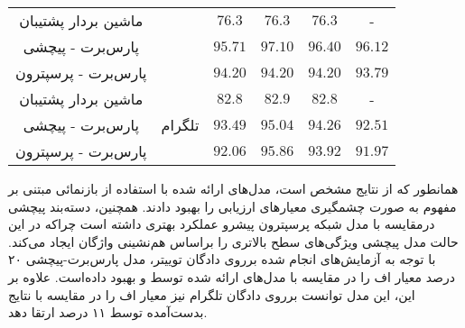 \begin{itemize}
\begin{table}
\begin{center}
\begin{tabular}{|c|c|c|c|c|c|}
			\cline{1-1}
			\cline{3-6}
			ماشین بردار پشتیبان \citep{jahanbakhsh2020model} &
			 & $76.3$ & $76.3$ & $76.3$ & - \\
			\cline{1-1}
			\cline{3-6}
			پارس‌برت - پیچشی & & $95.71$ & $97.10$ & $96.40$ & $96.12$ \\
			\cline{1-1}
			\cline{3-6}
			پارس‌برت - پرسپترون & & $94.20$ & $94.20$ & $94.20$ & $93.79$ \\
			\hline
			ماشین بردار پشتیبان \citep{jahanbakhsh2020model} &
			\multirow{3}{*}{تلگرام}& $82.8$ & $82.9$ & $82.8$ & - \\
			\cline{1-1}
			\cline{3-6}
			پارس‌برت - پیچشی & & $93.49$ & $95.04$ & $94.26$ & $92.51$ \\
			\cline{1-1}
			\cline{3-6}
			پارس‌برت - پرسپترون & & $92.06$ & $95.86$ & $93.92$ & $91.97$ \\
			\hline
		\end{tabular}
	\end{center}
\end{table}
\end{itemize}
	
	همانطور که از نتایج مشخص است، مدل‌های ارائه شده با استفاده از بازنمائی‌ مبتنی بر مفهوم به صورت چشمگیری معیار‌های ارزیابی را بهبود دادند. همچنین، دسته‌بند پیچشی درمقایسه با مدل شبکه پرسپترون پیشرو عملکرد بهتری داشته است چراکه در این حالت مدل پیچشی ویژگی‌های سطح بالاتری را براساس هم‌نشینی واژگان ایجاد می‌کند. با توجه به آزمایش‌های انجام شده برروی دادگان توییتر، مدل پارس‌برت-پیچشی ۲۰ درصد معیار اف را در مقایسه با مدل‌های ارائه شده توسط \cite{zamani2017rumor} و \cite{jahanbakhsh2020model} بهبود‌ داده‌است. علاوه بر این، این مدل توانست برروی دادگان تلگرام نیز معیار اف را در مقایسه با نتایج بدست‌آمده توسط \cite{jahanbakhsh2020model} 
	۱۱ درصد ارتقا دهد.
	
